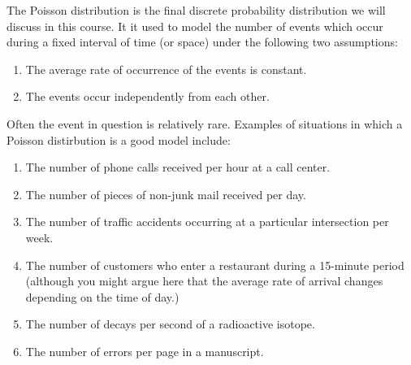 \documentclass[12pt]{article}
\theoremstyle{definition}
\theoremstyle{remark}
\begin{document}
The Poisson distribution is the final discrete probability distribution we will discuss in this course. It it used to model the number of events which occur during a fixed interval of time (or space) under the following two assumptions:
\begin{enumerate}
\item The average rate of occurrence of the events is constant.
\item The events occur independently from each other.
\end{enumerate}
Often the event in question is relatively rare. Examples of situations in which a Poisson distirbution is a good model include:
\begin{enumerate}
\item The number of phone calls received per hour at a call center.
\item The number of pieces of non-junk mail received per day.
\item The number of traffic accidents occurring at a particular intersection per week.
\item The number of customers who enter a restaurant during a 15-minute period (although you might argue here that the average rate of arrival changes depending on the time of day.)
\item The number of decays per second of a radioactive isotope.
\item The number of errors per page in a manuscript.
\end{enumerate}
\end{document}
